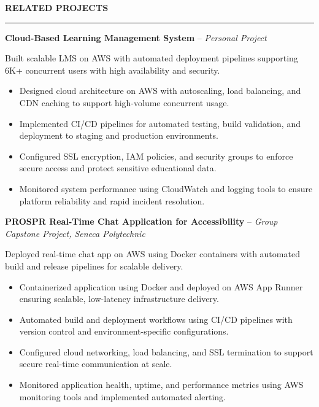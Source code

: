 \documentclass[10pt,letterpaper]{article}
\begin{document}
\vspace{6pt}

\textbf{RELATED PROJECTS}\\[-8pt]
\noindent\rule{\textwidth}{1pt}

\vspace{-2pt}

\textbf{Cloud-Based Learning Management System} -- \emph{Personal Project}

\vspace{-1pt}

Built scalable LMS on AWS with automated deployment pipelines supporting 6K+ concurrent users with high availability and security.
\vspace{-1pt}
\begin{itemize}
\item Designed cloud architecture on AWS with autoscaling, load balancing, and CDN caching to support high-volume concurrent usage.
\item Implemented CI/CD pipelines for automated testing, build validation, and deployment to staging and production environments.
\item Configured SSL encryption, IAM policies, and security groups to enforce secure access and protect sensitive educational data.
\item Monitored system performance using CloudWatch and logging tools to ensure platform reliability and rapid incident resolution.
\end{itemize}

\textbf{PROSPR  Real-Time Chat Application for Accessibility} -- \emph{Group Capstone Project, Seneca Polytechnic}

\vspace{-1pt}

Deployed real-time chat app on AWS using Docker containers with automated build and release pipelines for scalable delivery.
\vspace{-1pt}
\begin{itemize}
\item Containerized application using Docker and deployed on AWS App Runner ensuring scalable, low-latency infrastructure delivery.
\item Automated build and deployment workflows using CI/CD pipelines with version control and environment-specific configurations.
\item Configured cloud networking, load balancing, and SSL termination to support secure real-time communication at scale.
\item Monitored application health, uptime, and performance metrics using AWS monitoring tools and implemented automated alerting.
\end{itemize}
\end{document}
